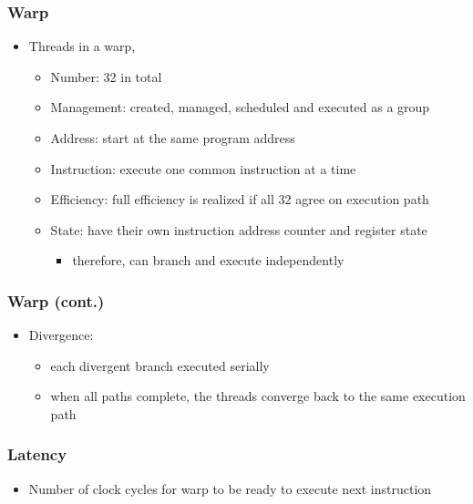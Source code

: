 \begin{frame}\frametitle{Warp}\logoEvolution\mypagenum
	\begin{itemize}
		\item Threads in a warp,
		\begin{itemize}
			\item {\color{red} Number:} 32 in total
			\item {\color{red} Management:} created, managed, scheduled and executed as a group
			\item {\color{red} Address:} start at the same program address
			\item {\color{red} Instruction:} execute one common instruction at a time
			\item {\color{red} Efficiency:} full efficiency is realized if all 32 agree on execution path
			\item {\color{red} State:} have their own instruction address counter and register state
			\begin{itemize}
				\item therefore, can branch and execute independently
			\end{itemize}
		
		\end{itemize}
	\end{itemize}
\end{frame}


\begin{frame}\frametitle{Warp (cont.)}\logoEvolution\mypagenum
	\begin{itemize}
		\item {\color{red} Divergence:}
		\begin{itemize}
			\item each divergent branch executed serially
			\item when all paths complete, the threads converge back to the same execution path
		\end{itemize}					
	\end{itemize}
\end{frame}



\begin{frame}\frametitle{Latency}\logoEvolution\mypagenum
	\begin{itemize}		
		\item Number of clock cycles for warp to be ready to execute next instruction
	\end{itemize}
\end{frame}



